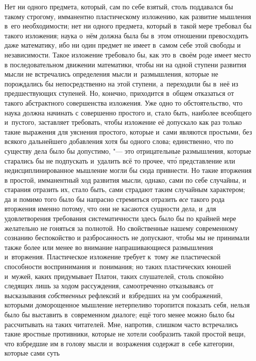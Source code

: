 Нет ни одного предмета, который, сам по себе взятый, столь поддавался бы такому
строгому, имманентно пластическому изложению, как развитие мышления в~его
необходимости; нет ни одного предмета, который в~такой мере требовал бы такого
изложения; наука о~нём должна была бы в~этом отношении превосходить даже
математику, ибо ни один предмет не имеет в~самом себе этой свободы и
независимости. Такое изложение требовало бы, как это в~своём роде имеет место в
последовательном движении математики, чтобы ни на одной ступени развития мысли
не встречались определения мысли и~размышления, которые не порождались бы
непосредственно на этой ступени, а~переходили бы в~неё из предшествующих
ступеней. Но, конечно, приходится в~общем отказаться от такого абстрактного
совершенства изложения. Уже одно то обстоятельство, что наука должна начинать с
совершенно простого и, стало быть, наиболее всеобщего и~пустого, заставляет
требовать, чтобы изложение её допускало как раз только такие выражения для
уяснения простого, которые и~сами являются простыми, без всякого дальнейшего
добавления хотя бы одного слова; единственно, что по существу дела было бы
допустимо, "--- это отрицательные размышления, которые старались бы не
подпускать и~удалить всё то прочее, чт\'{о} представление или
недисциплинированное мышление могли бы сюда привнести. Но такие вторжения в
простой, имманентный ход развития мысли, однако, сами по себе случайны, и
старания отразить их, стало быть, сами страдают таким случайным характером; да
и помимо того было бы напрасно стремиться отразить {\em все} такого рода вторжения
именно потому, что они не касаются сущности дела, и~для удовлетворения
требования систематичности здесь было бы по крайней мере желательно не гоняться
за полнотой. Но свойственные нашему современному сознанию беспокойство и
разбросанность не допускают, чтобы мы не принимали также более или менее во
внимание напрашивающиеся размышления и~вторжения. Пластическое изложение
требует к~тому же пластической способности воспринимания и~понимания; но таких
пластических юношей и~мужей, каких придумывает Платон, таких слушателей, столь
спокойно следящих лишь за ходом рассуждения, самоотреченно отказываясь от
высказывания {\em собственных} рефлексий и~взбредших на ум соображений,
которыми доморощенное мышление нетерпеливо торопится показать себя, нельзя было
бы выставить в~современном диалоге; ещё того менее можно было бы рассчитывать
на таких читателей. Мне, напротив, слишком часто встречались такие яростные
противники, которые не хотели сообразить такой простой вещи, что взбредшие им в
голову мысли и~возражения содержат в~себе категории, которые сами суть
